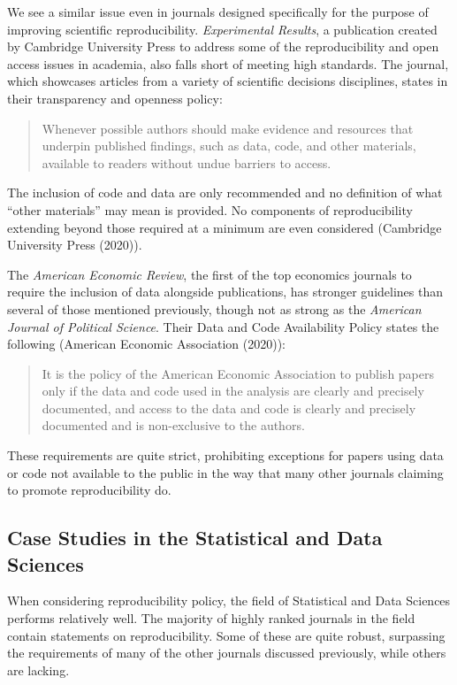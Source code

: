 \documentclass[12pt,twoside]{reedthesis}
\begin{document}
We see a similar issue even in journals designed specifically for the purpose of improving scientific reproducibility. \emph{Experimental Results}, a publication created by Cambridge University Press to address some of the reproducibility and open access issues in academia, also falls short of meeting high standards. The journal, which showcases articles from a variety of scientific decisions disciplines, states in their transparency and openness policy:
\begin{quote}
Whenever possible authors should make evidence and resources that underpin published findings, such as data, code, and other materials, available to readers without undue barriers to access.
\end{quote}
The inclusion of code and data are only recommended and no definition of what ``other materials'' may mean is provided. No components of reproducibility extending beyond those required at a minimum are even considered (Cambridge University Press (2020)).

The \emph{American Economic Review}, the first of the top economics journals to require the inclusion of data alongside publications, has stronger guidelines than several of those mentioned previously, though not as strong as the \emph{American Journal of Political Science}. Their Data and Code Availability Policy states the following (American Economic Association (2020)):
\begin{quote}
It is the policy of the American Economic Association to publish papers only if the data and code used in the analysis are clearly and precisely documented, and access to the data and code is clearly and precisely documented and is non-exclusive to the authors.
\end{quote}
These requirements are quite strict, prohibiting exceptions for papers using data or code not available to the public in the way that many other journals claiming to promote reproducibility do.

\hypertarget{case-studies-in-the-statistical-and-data-sciences}{%
\subsection{Case Studies in the Statistical and Data Sciences}\label{case-studies-in-the-statistical-and-data-sciences}}

When considering reproducibility policy, the field of Statistical and Data Sciences performs relatively well. The majority of highly ranked journals in the field contain statements on reproducibility. Some of these are quite robust, surpassing the requirements of many of the other journals discussed previously, while others are lacking.
\end{document}
